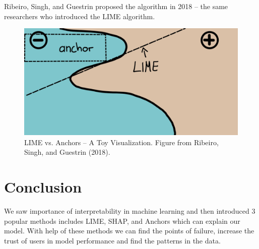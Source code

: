\documentclass[a4paper, 10pt,]{JournalArticle}
\begin{document}
Ribeiro, Singh, and Guestrin proposed the algorithm in 2018 \cite{Ribeiro_Singh_Guestrin_2018} – the same researchers who introduced the LIME algorithm.

\begin{figure}[H]
\centering 
\includegraphics[width=0.85\columnwidth]{Figures/anchors-visualization.png} 
\caption[An example of a floating figure]{LIME vs. Anchors – A Toy Visualization. Figure from Ribeiro, Singh, and Guestrin (2018).} 
\label{fig:LIMEvsANCHORS} 
\end{figure}


\section{Conclusion}
We saw importance of interpretability in machine learning and then introduced 3 popular methods includes LIME, SHAP, and Anchors which can explain our model.
With help of these methods we can find the points of failure, increase the trust of users in model performance and find the patterns in the data. 


\printbibliography %

\end{document}
